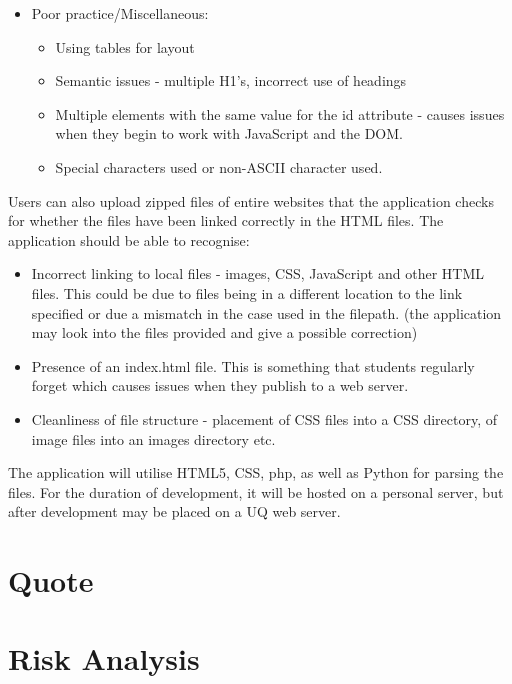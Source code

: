 \documentclass[12pt]{article}
\begin{document}
\begin{itemize}
\begin{itemize}
\end{itemize}
\item Poor practice/Miscellaneous:
\begin{itemize}
\item Using tables for layout
\item Semantic issues - multiple H1's, incorrect use of headings
\item Multiple elements with the same value for the id attribute - causes issues when they begin to work with JavaScript and the DOM.
\item Special characters used or non-ASCII character used.
\end{itemize}\end{itemize}

Users can also upload zipped files of entire websites that the application checks for whether the files have been linked correctly in the HTML files. The application should be able to recognise: 
\begin{itemize}
\item Incorrect linking to local files - images, CSS, JavaScript and other HTML files. This could be due to files being in a different location to the link specified or due a mismatch in the case used in the filepath. (the application may look into the files provided and give a possible correction)
\item  Presence of an index.html file. This is something that students regularly forget which causes issues when they publish to a web server.
\item  Cleanliness of file structure - placement of CSS files into a CSS directory, of image files into an images directory etc.
\end{itemize}

The application will utilise HTML5, CSS, php, as well as Python for parsing the files. For the duration of development, it will be hosted on a personal server, but after development may be placed on a UQ web server.

\section*{Quote}

\section*{Risk Analysis}
\end{document}
